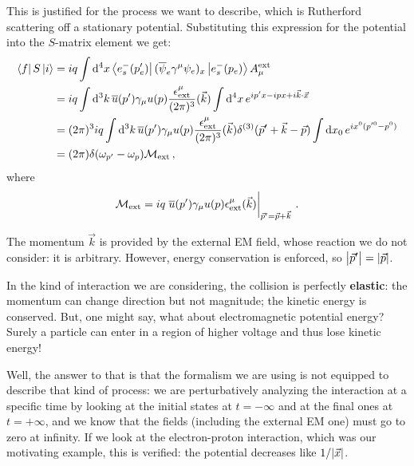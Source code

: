 \documentclass[main.tex]{subfiles}
\begin{document}
This is justified for the process we want to describe, which is Rutherford scattering off a stationary potential.  
Substituting this expression for the potential into the \(S\)-matrix element we get: 
%
\begin{align}
\bra{f} S \ket{i} &= i q \int \dd[4]{x}
\bra{e^{-}_{s} (p'_e)} 
(\overline{\psi}_{e} \gamma^{\mu} \psi_{e})_x 
\ket{e^{-}_{s}(p_e)}
A_{\mu }^{\text{ext}}  \\
&= iq \int \dd[3]{k} \overline{u} (p') \gamma_{\mu } u(p) \frac{\epsilon^{\mu }_{\text{ext}}}{(2 \pi )^3} (\vec{k}) \int  \dd[4]{x} e^{ip'x - i px + i \vec{k} \cdot \vec{x}}  \\
&= (2\pi)^3 iq \int \dd[3]{k} \overline{u} (p') \gamma_{\mu } u(p) \frac{\epsilon^{\mu }_{\text{ext}}}{(2 \pi )^3} (\vec{k}) \delta^{(3)} (\vec{p}' + \vec{k} - \vec{p})
\int \dd{x_0 } e^{ix^{0} (p^{\prime 0} - p^{0})}  \\
&= (2 \pi ) \delta(\omega_{p'} - \omega_{p}) \mathcal{M} _{\text{ext}}
\,,
\end{align}
%
where 
%
\begin{align}
\mathcal{M} _{\text{ext}} = i q \eval{\overline{u} (p') \gamma_{\mu } u(p) \epsilon^{\mu }_{\text{ext}} (\vec{k}) }_{\vec{p}' = \vec{p} + \vec{k}}
\,.
\end{align}

The momentum \(\vec{k}\) is provided by the external EM field, whose reaction we do not consider: it is arbitrary. However, energy conservation is enforced, so \(\abs{\vec{p}'} = \abs{\vec{p}}\). 

In the kind of interaction we are considering, the collision is perfectly \textbf{elastic}: the momentum can change direction but not magnitude; the kinetic energy is conserved. 
But, one might say, what about electromagnetic potential energy? Surely a particle can enter in a region of higher voltage and thus lose kinetic energy! 

Well, the answer to that is that the formalism we are using is not equipped to describe that kind of process: we are perturbatively analyzing the interaction at a specific time by looking at the initial states at \(t = - \infty\) and at the final ones at \(t = + \infty \), and we know that the fields (including the external EM one) must go to zero at infinity.
If we look at the electron-proton interaction, which was our motivating example, this is verified: the potential decreases like \(1 / \abs{\vec{x}}\). 
\end{document}
